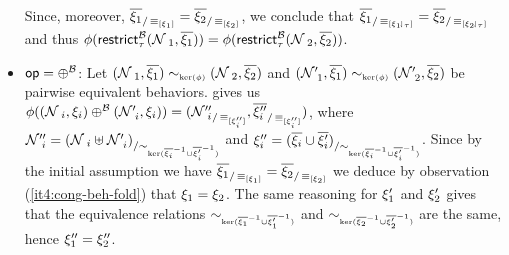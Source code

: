 \begin{proofE}
\begin{itemize}
      Since, moreover,
      ${\overline{\xi_1}}_{/\operatorname{{\equiv}}_{[\xi_1]}} =
      {\overline{\xi_2}}_{/\operatorname{{\equiv}}_{[\xi_2]}}$, we
      conclude that
      ${\overline{\xi_1}}_{/\operatorname{{\equiv}}_{[{\xi_1}\!\downharpoonleft_{\tau}]}}
      =
      {\overline{\xi_2}}_{/\operatorname{{\equiv}}_{[{\xi_2}\!\downharpoonleft_{\tau}]}}$
      and thus
      $\phi({\mathsf{restrict}^{\mathcal{B}}_{{\tau}}(\mathcal{N}_{~1},\overline{\xi_1})})
      =
      \phi({\mathsf{restrict}^{\mathcal{B}}_{{\tau}}(\mathcal{N}_{~2},\overline{\xi_2})})$. 
    \item $\mathsf{op} = \oplus^{\mathcal{B}}$: Let
      $(\mathcal{N}_{~1},\overline{\xi_1}) \sim_{\scriptscriptstyle{\mathrm{ker}(\phi)}}
      (\mathcal{N}_{~2},\overline{\xi_2})$ and
      $(\mathcal{N}'_{~1},\overline{\xi_1}) \sim_{\scriptscriptstyle{\mathrm{ker}(\phi)}}
      (\mathcal{N}'_{~2},\overline{\xi_2})$ be pairwise
      equivalent behaviors.   gives us
      $\phi((\mathcal{N}_{~i},\xi_i) \oplus^{\mathcal{B}}
      (\mathcal{N}'_{~i},\xi_i)) =
      ({\mathcal{N}''_{~i}}_{/\operatorname{{\equiv}}_{[\xi''_i]}},
      {\overline{\xi''_i}}_{/\operatorname{{\equiv}}_{[\xi''_i]}})$,
      where $\mathcal{N}''_{~i} = {(\mathcal{N}_{~i} \uplus
        \mathcal{N}'_{~i})}_{/\sim_{\scriptscriptstyle{\mathrm{ker}(\overline{\xi_i}^{-1}\cup\overline{\xi'_i}^{-1})}}}$ and
      $\xi''_i =
      {(\overline{\xi_i}\cup\overline{\xi'_i})}_{/\sim_{\scriptscriptstyle{\mathrm{ker}(\overline{\xi_i}^{-1}\cup\overline{\xi'_i}^{-1})}}}$.
      Since by the initial assumption we have
      ${\overline{\xi_1}}_{/\operatorname{{\equiv}}_{[\xi_1]}} =
      {\overline{\xi_2}}_{/\operatorname{{\equiv}}_{[\xi_2]}}$ we
      deduce by observation (\ref{it4:cong-beh-fold}) that $\xi_1
      = \xi_2$.  The same reasoning for $\xi'_1$ and
      $\xi'_2$ gives that the equivalence relations
      $\sim_{\scriptscriptstyle{\mathrm{ker}(\overline{\xi_1}^{-1}\cup\overline{\xi'_1}^{-1})}}$ and
      $\sim_{\scriptscriptstyle{\mathrm{ker}(\overline{\xi_2}^{-1}\cup\overline{\xi'_2}^{-1})}}$ are the same, hence
      $\xi''_1 = \xi''_2$.


\end{itemize}
\end{proofE}
